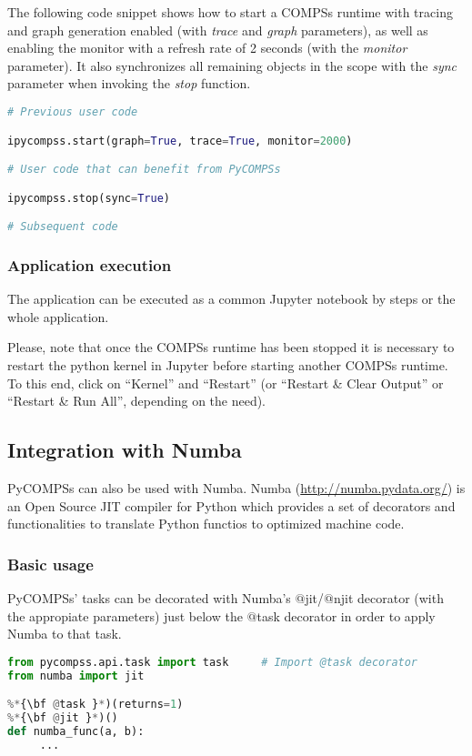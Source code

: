 The following code snippet shows how to start a COMPSs runtime with tracing and graph generation enabled (with {\it trace} and {\it graph} parameters), as well as enabling the monitor with a refresh rate of 2 seconds (with the {\it monitor} parameter).
It also synchronizes all remaining objects in the scope with the {\it sync} parameter when invoking the {\it stop} function.

\begin{lstlisting}[language=python]
# Previous user code

ipycompss.start(graph=True, trace=True, monitor=2000)

# User code that can benefit from PyCOMPSs

ipycompss.stop(sync=True)

# Subsequent code
\end{lstlisting}

\subsubsection{Application execution}

The application can be executed as a common Jupyter notebook by steps or the whole application.

Please, note that once the COMPSs runtime has been stopped it is necessary to restart the python kernel in Jupyter before starting another COMPSs runtime.
To this end, click on ``Kernel'' and ``Restart'' (or ``Restart \& Clear Output'' or ``Restart \& Run All'', depending on the need).


\subsection{Integration with Numba}

PyCOMPSs can also be used with Numba.
Numba (\url{http://numba.pydata.org/}) is an Open Source JIT compiler for Python which provides a set of decorators and functionalities to translate Python functios to optimized machine code.

\subsubsection{Basic usage}

PyCOMPSs' tasks can be decorated with Numba's $@$jit/$@$njit decorator (with the appropiate parameters) just below the $@$task decorator in order to apply Numba to that task.

\begin{lstlisting}[language=python]
from pycompss.api.task import task     # Import @task decorator
from numba import jit

%*{\bf @task }*)(returns=1)
%*{\bf @jit }*)()
def numba_func(a, b):
     ...
\end{lstlisting}

